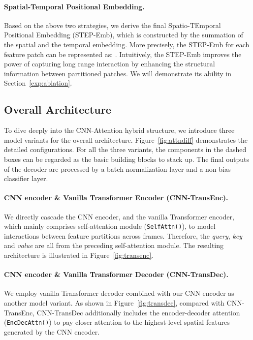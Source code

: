 \documentclass[10pt,twocolumn,letterpaper]{article}
\begin{document}
\vspace{-2mm}
\paragraph{Spatial-Temporal Positional Embedding.}
Based on the above two strategies, we derive the final Spatio-TEmporal Positional Embedding (STEP-Emb), which is constructed by the summation of the spatial and the temporal embedding. More precisely, the STEP-Emb for each feature patch  can be represented as: . Intuitively, the STEP-Emb improves the power of capturing long range interaction by enhancing the structural information between partitioned patches. We will demonstrate its ability in Section~\ref{exp:ablation}.

\subsection{Overall Architecture}
\label{sec:overall}
To dive deeply into the CNN-Attention hybrid structure, we introduce three model variants for the overall architecture. Figure~\ref{fig:attndiff} demonstrates the detailed configurations. For all the three variants, the components in the dashed boxes can be regarded as the basic building blocks to stack up. The final outputs of the decoder are processed by a batch normalization layer and a non-bias classifier layer.

\vspace{-2mm}
\paragraph{CNN encoder \& Vanilla Transformer Encoder (CNN-TransEnc).}
We directly cascade the CNN encoder, and the vanilla Transformer encoder, which mainly comprises self-attention module (\texttt{SelfAttn()}), to model interactions between feature partitions across frames. Therefore, the \textit{query}, \textit{key} and \textit{value} are all from the preceding self-attention module. The resulting architecture is illustrated in Figure~\ref{fig:transenc}.

\vspace{-2mm}
\paragraph{CNN encoder \& Vanilla Transformer Decoder (CNN-TransDec).}
We employ vanilla Transformer decoder combined with our CNN encoder as another model variant. As shown in Figure~\ref{fig:transdec}, compared with CNN-TransEnc, CNN-TransDec additionally includes the encoder-decoder attention (\texttt{EncDecAttn()}) to pay closer attention to the highest-level spatial features generated by the CNN encoder.
\end{document}
